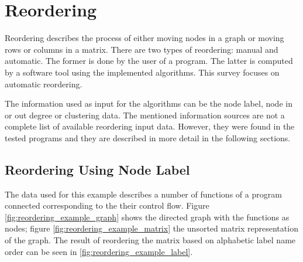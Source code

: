 %
%
% 
% 
% 


\chapter{Reordering}
\label{chap:reordering}

Reordering describes the process of either moving nodes in a graph or moving rows or columns in a matrix. There are two types of reordering: manual and automatic. The former is done by the user of a program. The latter is computed by a software tool using the implemented algorithms. This survey focuses on automatic reordering.

The information used as input for the algorithms can be the node label, node in or out degree or clustering data. The mentioned information sources are not a complete list of available reordering input data. However, they were found in the tested programs and they are described in more detail in the following sections.


\section{Reordering Using Node Label}
\label{sec:reordering_label}
The data used for this example describes a number of functions of a program connected corresponding to the their control flow. Figure \ref{fig:reordering_example_graph} shows the directed graph with the functions as nodes; figure \ref{fig:reordering_example_matrix} the unsorted matrix representation of the graph. The result of reordering the matrix based on alphabetic label name order can be seen in \ref{fig:reordering_example_label}.

